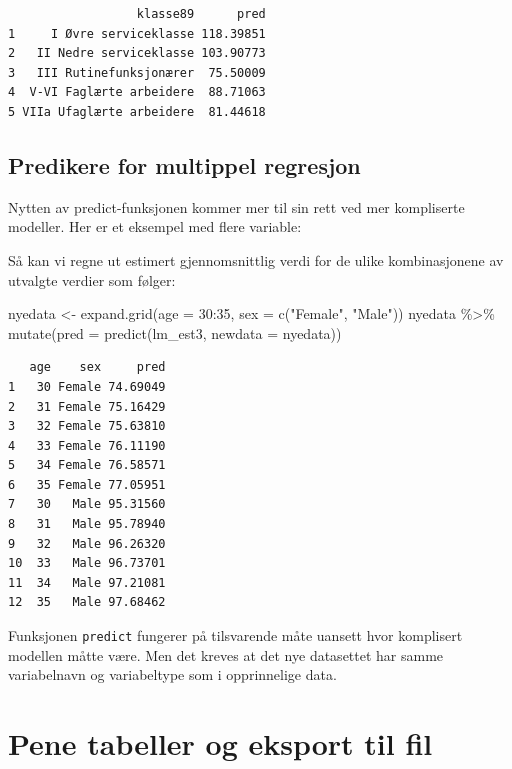 \documentclass[
  letterpaper,
  DIV=11,
  numbers=noendperiod]{scrreprt}
\newenvironment{Shaded}{\begin{snugshade}}{\end{snugshade}}
\newcommand{\AttributeTok}[1]{\textcolor[rgb]{0.40,0.45,0.13}{#1}}
\newcommand{\DecValTok}[1]{\textcolor[rgb]{0.68,0.00,0.00}{#1}}
\newcommand{\FunctionTok}[1]{\textcolor[rgb]{0.28,0.35,0.67}{#1}}
\newcommand{\NormalTok}[1]{\textcolor[rgb]{0.00,0.23,0.31}{#1}}
\newcommand{\OtherTok}[1]{\textcolor[rgb]{0.00,0.23,0.31}{#1}}
\newcommand{\SpecialCharTok}[1]{\textcolor[rgb]{0.37,0.37,0.37}{#1}}
\newcommand{\StringTok}[1]{\textcolor[rgb]{0.13,0.47,0.30}{#1}}
\theoremstyle{definition}
\theoremstyle{remark}
\begin{document}
\begin{verbatim}
                  klasse89      pred
1     I Øvre serviceklasse 118.39851
2   II Nedre serviceklasse 103.90773
3   III Rutinefunksjonærer  75.50009
4  V-VI Faglærte arbeidere  88.71063
5 VIIa Ufaglærte arbeidere  81.44618
\end{verbatim}

\hypertarget{predikere-for-multippel-regresjon}{%
\subsection{Predikere for multippel
regresjon}\label{predikere-for-multippel-regresjon}}

Nytten av predict-funksjonen kommer mer til sin rett ved mer kompliserte
modeller. Her er et eksempel med flere variable:

Så kan vi regne ut estimert gjennomsnittlig verdi for de ulike
kombinasjonene av utvalgte verdier som følger:

\begin{Shaded}
\begin{Highlighting}[]
\NormalTok{nyedata }\OtherTok{\textless{}{-}} \FunctionTok{expand.grid}\NormalTok{(}\AttributeTok{age =} \DecValTok{30}\SpecialCharTok{:}\DecValTok{35}\NormalTok{, }
                      \AttributeTok{sex =} \FunctionTok{c}\NormalTok{(}\StringTok{"Female"}\NormalTok{, }\StringTok{"Male"}\NormalTok{))}
\NormalTok{nyedata }\SpecialCharTok{\%\textgreater{}\%} 
  \FunctionTok{mutate}\NormalTok{(}\AttributeTok{pred =} \FunctionTok{predict}\NormalTok{(lm\_est3, }\AttributeTok{newdata =}\NormalTok{ nyedata))}
\end{Highlighting}
\end{Shaded}

\begin{verbatim}
   age    sex     pred
1   30 Female 74.69049
2   31 Female 75.16429
3   32 Female 75.63810
4   33 Female 76.11190
5   34 Female 76.58571
6   35 Female 77.05951
7   30   Male 95.31560
8   31   Male 95.78940
9   32   Male 96.26320
10  33   Male 96.73701
11  34   Male 97.21081
12  35   Male 97.68462
\end{verbatim}

Funksjonen \texttt{predict} fungerer på tilsvarende måte uansett hvor
komplisert modellen måtte være. Men det kreves at det nye datasettet har
samme variabelnavn og variabeltype som i opprinnelige data.

\hypertarget{pene-tabeller-og-eksport-til-fil}{%
\section{Pene tabeller og eksport til
fil}\label{pene-tabeller-og-eksport-til-fil}}
\end{document}
